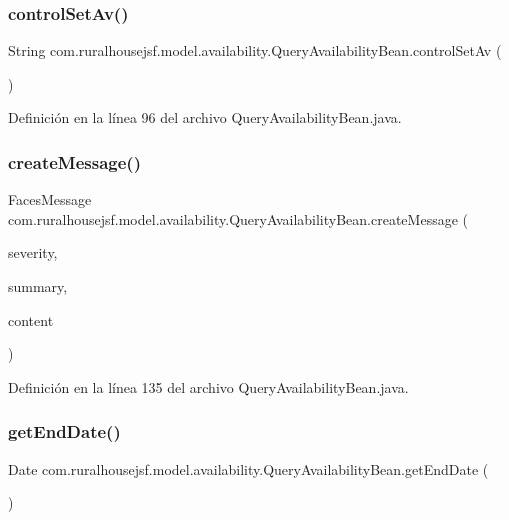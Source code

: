 \subsubsection{\texorpdfstring{controlSetAv()}{controlSetAv()}}
{\footnotesize\ttfamily String com.\+ruralhousejsf.\+model.\+availability.\+Query\+Availability\+Bean.\+control\+Set\+Av (\begin{DoxyParamCaption}{ }\end{DoxyParamCaption})}



Definición en la línea 96 del archivo Query\+Availability\+Bean.\+java.

\mbox{\label{a00224_a0f1bb887ac4c3b90551c76fb51ba9253}} 
\subsubsection{\texorpdfstring{createMessage()}{createMessage()}}
{\footnotesize\ttfamily Faces\+Message com.\+ruralhousejsf.\+model.\+availability.\+Query\+Availability\+Bean.\+create\+Message (\begin{DoxyParamCaption}\item[{Faces\+Message.\+Severity}]{severity,  }\item[{String}]{summary,  }\item[{String}]{content }\end{DoxyParamCaption})\hspace{0.3cm}{\ttfamily [private]}}



Definición en la línea 135 del archivo Query\+Availability\+Bean.\+java.

\mbox{\label{a00224_ad88c5dd8af5a7bfd0cccd39b0ce380df}} 
\subsubsection{\texorpdfstring{getEndDate()}{getEndDate()}}
{\footnotesize\ttfamily Date com.\+ruralhousejsf.\+model.\+availability.\+Query\+Availability\+Bean.\+get\+End\+Date (\begin{DoxyParamCaption}{ }\end{DoxyParamCaption})}



